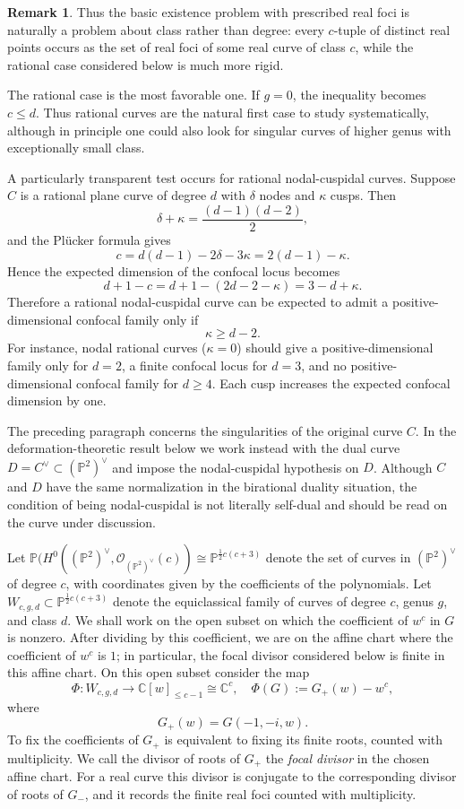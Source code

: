 \documentclass[11pt]{amsart}
\theoremstyle{definition}
\newtheorem{remark}[lemma]{Remark}
\theoremstyle{remark}
\newcommand{\bC}{\mathbb{C}}
\newcommand{\bP}{\mathbb{P}}
\begin{document}
\begin{remark}
Thus the basic existence problem with prescribed real foci is naturally a problem about class rather than degree: every $c$-tuple of distinct real points occurs as the set of real foci of some real curve of class $c$, while the rational case considered below is much more rigid.
\end{remark}


The rational case is the most favorable one. If $g=0$, the inequality becomes $c\le d$. Thus rational curves are the natural first case to study systematically, although in principle one could also look for singular curves of higher genus with exceptionally small class.

A particularly transparent test occurs for rational nodal-cuspidal curves. Suppose $C$ is a rational plane curve of degree $d$ with $\delta$ nodes and $\kappa$ cusps. Then
\[
\delta+\kappa=\frac{(d-1)(d-2)}{2},
\]
and the Pl\"ucker formula gives
\[
c=d(d-1)-2\delta-3\kappa=2(d-1)-\kappa.
\]
Hence the expected dimension of the confocal locus becomes
\[
d+1-c=d+1-(2d-2-\kappa)=3-d+\kappa.
\]
Therefore a rational nodal-cuspidal curve can be expected to admit a positive-dimensional confocal family only if
\[
\kappa\ge d-2.
\]
For instance, nodal rational curves ($\kappa=0$) should give a positive-dimensional family only for $d=2$, a finite confocal locus for $d=3$, and no positive-dimensional confocal family for $d\ge 4$. Each cusp increases the expected confocal dimension by one.

The preceding paragraph concerns the singularities of the original curve $C$.  In the deformation-theoretic result below we work instead with the dual curve
$D=C^\vee\subset (\mathbb P^2)^\vee$ and impose the nodal-cuspidal hypothesis on $D$.  Although $C$ and $D$ have the same normalization in the birational duality situation, the condition of being nodal-cuspidal is not literally self-dual and should be read on the curve under discussion.

Let $\mathbb P(H^0((\mathbb P^2)^\vee,\mathcal O_{(\mathbb P^2)^\vee}(c))\cong \mathbb P^{\frac{1}2 c(c+3)}$ denote the set of curves in $(\bP^2)^\vee$ of degree $c$, with coordinates given by the coefficients of the polynomials. Let $W_{c,g,d}\subset \mathbb P^{\frac{1}2 c(c+3)}$ denote the equiclassical family of curves of degree $c$, genus $g$, and class $d$. We shall work on the open subset on which the coefficient of $w^c$ in $G$ is nonzero. After dividing by this coefficient, we are on the affine chart where the coefficient of $w^c$ is $1$; in particular, the focal divisor considered below is finite in this affine chart.  On this open subset consider the map
\[
\Phi\colon W_{c,g,d} \to \mathbb C[w]_{\le c-1}\cong \bC^{c}, \quad
\Phi(G):=G_+(w)-w^c,
\]
where
\[
G_+(w)=G(-1,-i,w).
\]
To fix the coefficients of $G_+$ is equivalent to fixing its finite roots, counted with multiplicity.  We call the divisor of roots of $G_+$ the \emph{focal divisor} in the chosen affine chart.  For a real curve this divisor is conjugate to the corresponding divisor of roots of $G_-$, and it records the finite real foci counted with multiplicity.
\end{document}
